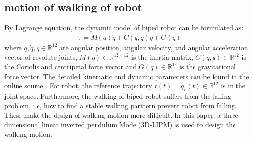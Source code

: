 \documentclass{ieeeaccess}
\begin{document}

\subsection{motion of walking of robot}
By Lagrange equation, the dynamic model of biped robot can be formulated as:
\begin{equation} \label{eq:robot} 
    \begin{split}
        & \tau = M(q)\ddot{q} + C(q,\dot{q})\dot{q} + G(q)    
    \end{split}
\end{equation}
where $q,\dot{q},\ddot{q}\in\mathbb{R}^{12}$  are angular position, angular velocity, and angular acceleration vector of revolute joints, $M(q)\in\mathbb{R}^{12\times 12}$ is the inertia matrix, $C(q,\dot{q})\in\mathbb{R}^{12}$ is the Coriolis and centripetal force vector and $G(q)\in\mathbb{R}^{12}$ is the gravitational force vector. The detailed kinematic and dynamic parameters can be found in the online source \cite{ourrobot}. For robot, the reference trajectory $r(t)=q_r(t)\in\mathbb{R}^{12}$ is in the joint space. Furthermore, the walking of biped-robot suffers from the falling problem, i.e, how to find a stable walking parttern prevent robot from falling. These make the design of walking motion more difficult. In this paper, a three-dimensional linear inverted pendulum Mode (3D-LIPM) \cite{kajita2001real} is used to design the walking motion.
\end{document}
